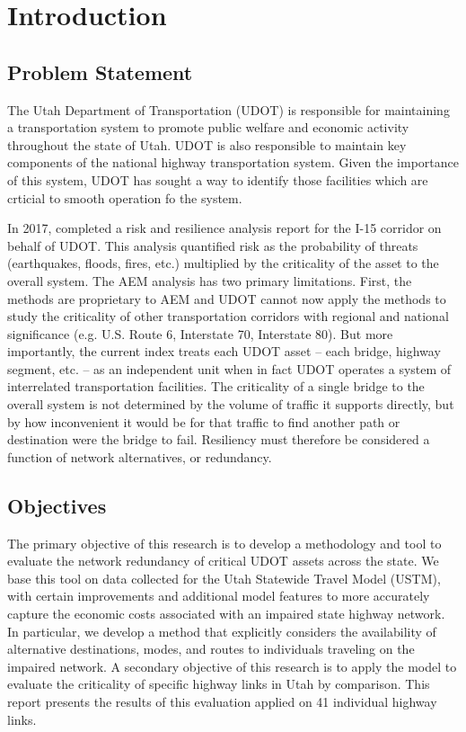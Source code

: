 \chapter{Introduction}
\label{chp:chapter1}
\graphicspath{{figures/}{figures/chapter1/}}

\section{Problem Statement}
The Utah Department of Transportation (UDOT)  is responsible for maintaining a transportation
 system to promote public welfare and economic activity throughout the state of Utah. UDOT is also
 responsible to maintain key components of the national highway transportation system. Given the
 importance of this system, UDOT has sought a way to identify those facilities
 which are crticial to smooth operation fo the system.

In 2017, \cite{aem2017} completed a risk and resilience analysis report for the I-15 corridor on behalf of
UDOT. This analysis quantified risk as the probability of threats (earthquakes, floods, fires,
etc.) multiplied by the criticality of the asset to the overall system. The AEM
analysis has two primary limitations. First, the methods are proprietary to
AEM and UDOT cannot now apply the methods to study the criticality of other transportation
corridors with regional and national significance (e.g. U.S. Route 6, Interstate 70, Interstate 80). But more
importantly, the current index treats each UDOT asset – each bridge, highway segment, etc. – as an
independent unit when in fact UDOT operates a system of interrelated transportation facilities. The criticality
of a single bridge to the overall system is not determined by the volume of traffic it supports
directly, but by how inconvenient it would be for that traffic to find another path or destination
were the bridge to fail. Resiliency must therefore be considered a function of network
alternatives, or redundancy.

\section{Objectives}
The primary objective of this research is to develop a methodology and tool to evaluate the
network redundancy of critical UDOT assets across the state. We base this tool on data collected
for the Utah Statewide Travel Model (USTM), with certain improvements and additional model
features to more accurately capture the economic costs associated with an impaired state highway
network. In particular, we develop a method that explicitly considers the availability of
alternative destinations, modes, and routes to individuals traveling on the impaired network. A
secondary objective of this research is to apply the model to evaluate the criticality of
specific
highway links in Utah by comparison. This report presents the results of this evaluation applied
on 41 individual highway links.


